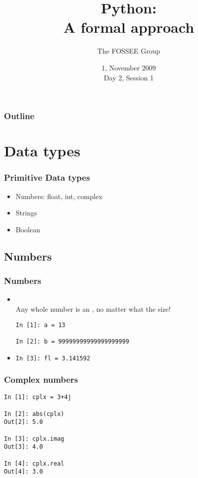 \documentclass[14pt,compress]{beamer}
\title[Basic Python]{Python:\\A formal approach}
\author[FOSSEE Team] {The FOSSEE Group}
\institute[IIT Bombay] {Department of Aerospace Engineering\\IIT Bombay}
\date[] {1, November 2009\\Day 2, Session 1}
\newcommand{\kwrd}[1]{ \texttt{\textbf{\color{blue}{#1}}}  }
\begin{document}
\begin{frame}
  \titlepage
\end{frame}

\begin{frame}
  \frametitle{Outline}
  \tableofcontents
\end{frame}

\section{Data types}

\begin{frame}
  \frametitle{Primitive Data types}
  \begin{itemize}
    \item Numbers: float, int, complex
    \item Strings
    \item Boolean
  \end{itemize}
\end{frame}

\subsection{Numbers}
\begin{frame}[fragile]
  \frametitle{Numbers}
  \begin{itemize}
    \item \kwrd{int}\\ Any whole number is an \kwrd{int}, no matter what the size!
  \begin{lstlisting}
In [1]: a = 13

In [2]: b = 99999999999999999999
  \end{lstlisting}
    \item \kwrd{float}
  \begin{lstlisting}
In [3]: fl = 3.141592
  \end{lstlisting}
  \end{itemize}
\end{frame}

\begin{frame}[fragile]
\frametitle{Complex numbers}
  \begin{lstlisting}
In [1]: cplx = 3+4j

In [2]: abs(cplx)
Out[2]: 5.0

In [3]: cplx.imag
Out[3]: 4.0

In [4]: cplx.real
Out[4]: 3.0
  \end{lstlisting}
\end{frame}
\end{document}
